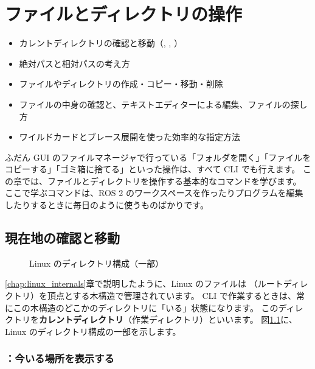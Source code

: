 \chapter{ファイルとディレクトリの操作}
\label{chap:files}

\begin{goalbox}
  \begin{itemize}
    \item カレントディレクトリの確認と移動（, , ）
    \item 絶対パスと相対パスの考え方
    \item ファイルやディレクトリの作成・コピー・移動・削除
    \item ファイルの中身の確認と、テキストエディターによる編集、ファイルの探し方
    \item ワイルドカードとブレース展開を使った効率的な指定方法
  \end{itemize}
\end{goalbox}

ふだん GUI のファイルマネージャで行っている「フォルダを開く」「ファイルをコピーする」「ゴミ箱に捨てる」といった操作は、すべて CLI でも行えます。
この章では、ファイルとディレクトリを操作する基本的なコマンドを学びます。
ここで学ぶコマンドは、ROS 2 のワークスペースを作ったりプログラムを編集したりするときに毎日のように使うものばかりです。

\section{現在地の確認と移動}
\label{sec:files-navigation}

\begin{figure}[tb]
  \centering
  
  \caption{Linux のディレクトリ構成（一部）}
  \label{fig:files-tree}
\end{figure}

\ref{chap:linux_internals}章で説明したように、Linux のファイルは \cmd{/}（ルートディレクトリ）を頂点とする木構造で管理されています。
CLI で作業するときは、常にこの木構造のどこかのディレクトリに「いる」状態になります。
このディレクトリを\textbf{カレントディレクトリ}（作業ディレクトリ）といいます。
図\ref{fig:files-tree}に、Linux のディレクトリ構成の一部を示します。

\subsection{：今いる場所を表示する}


